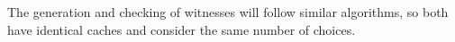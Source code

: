 \documentclass{llncs}
\newcommand{\figfoot}{\vspace{1ex}\hrule}
\newcommand{\vd}{\vdash}
\begin{document}
\begin{center}
\begin{small}
\begin{description}
\end{description}
\end{small}    
%
\end{center}


The generation and checking of witnesses will follow similar
algorithms, so both have identical caches and consider the same number
of choices. 
\end{document}
